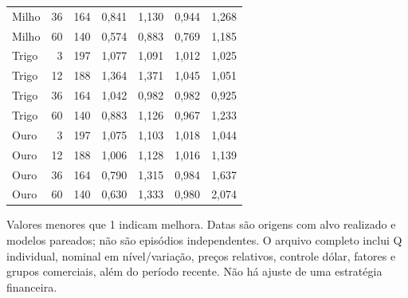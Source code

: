 \documentclass[11pt,a4paper]{article}
\begin{document}
\begin{center}
\begin{tabular}{lrrrrrr}
Milho & 36 & 164 & 0,841 & 1,130 & 0,944 & 1,268 \\
Milho & 60 & 140 & 0,574 & 0,883 & 0,769 & 1,185 \\
Trigo & 3 & 197 & 1,077 & 1,091 & 1,012 & 1,025 \\
Trigo & 12 & 188 & 1,364 & 1,371 & 1,045 & 1,051 \\
Trigo & 36 & 164 & 1,042 & 0,982 & 0,982 & 0,925 \\
Trigo & 60 & 140 & 0,883 & 1,126 & 0,967 & 1,233 \\
Ouro & 3 & 197 & 1,075 & 1,103 & 1,018 & 1,044 \\
Ouro & 12 & 188 & 1,006 & 1,128 & 1,016 & 1,139 \\
Ouro & 36 & 164 & 0,790 & 1,315 & 0,984 & 1,637 \\
Ouro & 60 & 140 & 0,630 & 1,333 & 0,980 & 2,074 \\
\bottomrule\end{tabular}\end{center}\normalsize

Valores menores que 1 indicam melhora. Datas são origens com alvo realizado e modelos pareados; não são episódios independentes. O arquivo completo inclui Q individual, nominal em nível/variação, preços relativos, controle dólar, fatores e grupos comerciais, além do período recente. Não há ajuste de uma estratégia financeira.

\clearpage
\end{document}
